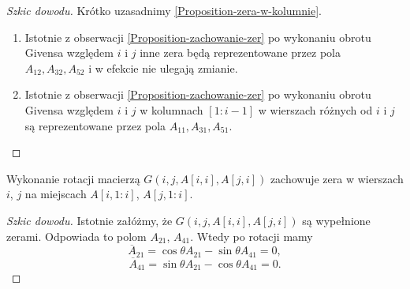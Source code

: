 \documentclass[12pt,a4paper]{report}
\newcommand{\mx}[1]{{#1}}
\begin{document}
\begin{proof}[Szkic dowodu]
Krótko uzasadnimy \ref{Proposition-zera-w-kolumnie}.
\begin{enumerate}
\item Istotnie z obserwacji \ref{Proposition-zachowanie-zer} po wykonaniu obrotu Givensa względem $i$ i $j$ inne zera będą reprezentowane przez pola $\mx{A}_{12}, \mx{A}_{32}, \mx{A}_{52}$ i w efekcie nie ulegają zmianie.
\item Istotnie z obserwacji \ref{Proposition-zachowanie-zer} po wykonaniu obrotu Givensa względem $i$ i $j$ w kolumnach $[1:i-1]$ w wierszach różnych od $i$ i $j$ są reprezentowane przez pola $\mx{A}_{11},\mx{A}_{31},\mx{A}_{51}$.
\end{enumerate}
\end{proof}



\begin{proposition}\label{Proposition-zera-w-wierszach}
Wykonanie rotacji macierzą $\mx{G}(i,j, \mx{A}[i,i], \mx{A}[j,i])$ zachowuje zera w wierszach $i$, $j$ na miejscach $\mx{A}[i,1:i]$, $\mx{A}[j, 1:i]$. 
\end{proposition}
\begin{proof}[Szkic dowodu]

Istotnie załóżmy, że $\mx{G}(i,j, \mx{A}[i,i], \mx{A}[j,i])$ są wypełnione zerami. Odpowiada to polom $\mx{A}_{21}$, $\mx{A}_{41}$. Wtedy po rotacji mamy 
$$
\overline{\mx{A}}_{21} = \cos\theta\mx{A}_{21} - \sin\theta\mx{A}_{41} = 0,
$$  
$$
\overline{\mx{A}}_{41} = \sin\theta\mx{A}_{21} - \cos\theta\mx{A}_{41} = 0.
$$
\end{proof}
\end{document}
